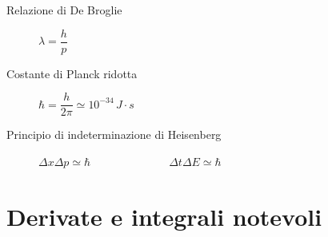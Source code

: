 \documentclass[a4paper,11pt,italian]{article}
\begin{document}
\begin{description}
  \item[Relazione di De Broglie] 
  $ \lambda = \dfrac{h}{p} $%
  
  
  \item[Costante di Planck ridotta] 
  $ \hbar = \dfrac{h}{2 \pi} \simeq 10^{-34} \, J\cdot s $
  
  \item[Principio di indeterminazione di Heisenberg] $ \Delta x \Delta p \simeq \hbar $~~~~~~~~~~~~~~$ \Delta t \Delta E \simeq \hbar $
  
%   
%   
\end{description}


\newpage
\section{Derivate e integrali notevoli}
\end{document}
